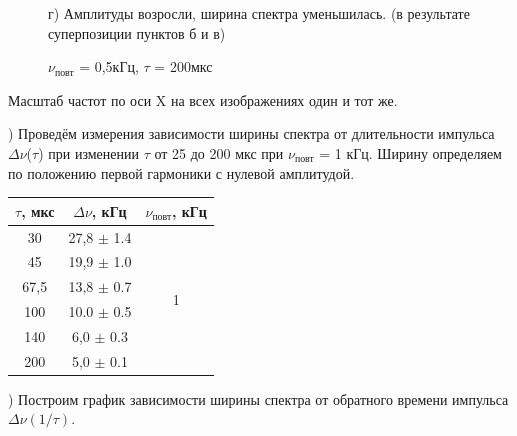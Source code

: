\documentclass[a4paper,12pt]{article}
\begin{document}
\begin{figure}[h]
\caption{$\nu_{\text{повт}}$ = 0,5кГц, $\tau$ = 200мкс}
г) Амплитуды возросли, ширина спектра уменьшилась. (в результате суперпозиции пунктов б и в) 
\end{figure}

Масштаб частот по оси X на всех изображениях один и тот же.

) Проведём измерения зависимости ширины спектра от длительности импульса $\Delta\nu$($\tau$) при изменении $\tau$ от 25 до 200 мкс при $\nu_{\text{повт}}$ = 1 кГц. Ширину определяем по положению первой гармоники с нулевой амплитудой.

\begin{center}
\begin{tabular}{|c|c|c|}
	\hline
	$\tau$, мкс & $\Delta\nu$, кГц & $\nu_{\text{повт}}$, кГц \\
	\hline
	30 & 27,8 $\pm$ 1.4  & \multirow{6}{*}{1}\\
	\cline{1-2} 45 & 19,9 $\pm$ 1.0 & \\
	\cline{1-2} 67,5 & 13,8 $\pm$ 0.7 & \\
	\cline{1-2} 100 & 10.0 $\pm$ 0.5 & \\
	\cline{1-2} 140 & 6,0 $\pm$ 0.3 & \\
	\cline{1-2} 200 & 5,0 $\pm$ 0.1 & \\
	\hline
\end{tabular}
\end{center}

) Построим график зависимости ширины спектра от обратного времени импульса $\Delta\nu(1/\tau)$.

\end{document}
